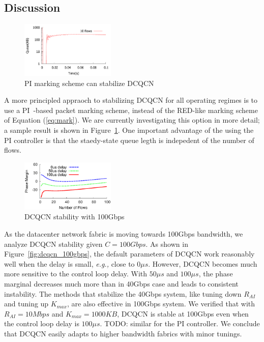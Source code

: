 \subsection{Discussion}

\begin{figure}
\center
\includegraphics[width=0.4\textwidth]{figures/stable_q_85_pi.pdf}
\caption{PI marking scheme can stabilize DCQCN}
\label{fig:dcqcn_pi}
\end{figure}

A more principled appraoch to stabilizing DCQCN for all operating regimes is to
use a PI~\cite{Hollot:PIController}-based packet marking scheme, instead of the
RED-like marking scheme of Equation (\ref{eq:mark}). We are currently
investigating this option in more detail; a sample result is shown in
Figure~\ref{fig:dcqcn_pi}. One important advantage of the using the PI
controller is that the staedy-state queue legth is indepedent of the number of
flows.

\begin{figure}[t]
\center
\includegraphics[width=0.4\textwidth]{figures/dcqcn_stability_100gbps.eps}
\caption{DCQCN stability with 100Gbps}
\end{figure}

  As the datacenter network fabric is moving
towards 100Gbps bandwidth, we analyze DCQCN stability given $C=100Gbps$. As
shown in Figure~\ref{fig:dcqcn_100gbps}, the default parameters of DCQCN work
reasonably well when the delay is small, {\em e.g.,} close to $0\mu s$.
However, DCQCN becomes much more sensitive to the control loop delay. With
$50\mu s$ and $100\mu s$, the phase marginal decreases much more than in 40Gbps
case and leads to consistent instability.  The methods that stabilize the 40Gbps
system, like tuning down $R_{AI}$ and tuning up $K_{max}$, are also effective in
100Gbps system. We verified that with $R_{AI}=10Mbps$ and $K_{max}=1000KB$,
DCQCN is stable at 100Gbps even when the control loop delay is $100\mu s$. TODO:
similar for the PI controller. We conclude that DCQCN easily adapts to higher
bandwidth fabrics with minor tunings. 


